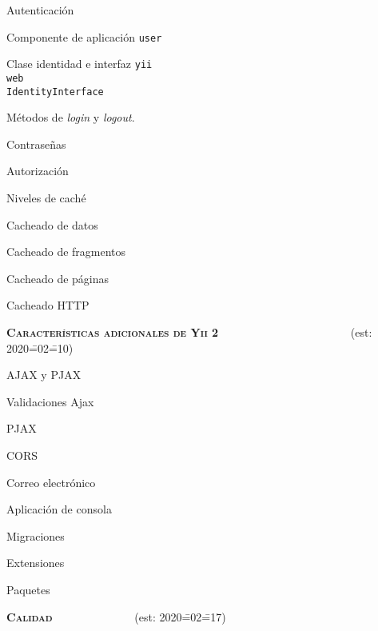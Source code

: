 \begin{longenum}
\begin{longenum}
        \item Autenticación
        \begin{longenum}
            \item Componente de aplicación \texttt{user}
            \item Clase identidad e interfaz \texttt{yii\\web\\IdentityInterface}
            \item Métodos de \textit{login} y \textit{logout}.
        \end{longenum}
        \item Contraseñas
        \item Autorización
        \item Niveles de caché
        \begin{longenum}
            \item Cacheado de datos
            \item Cacheado de fragmentos
            \item Cacheado de páginas
            \item Cacheado HTTP
        \end{longenum}
    \end{longenum}
    \item \textbf{\textsc{Características adicionales de Yii 2}} \ \ \ \ \ \ \ \ \ \ \ \ \ \ \ \ \ \ \ \ \ \ \ (est: 2020\==02\==10)
    \begin{longenum}
        \item AJAX y PJAX
        \begin{longenum}
            \item Validaciones Ajax
            \item PJAX \opcional\
            \item CORS \opcional\
        \end{longenum}
        \item Correo electrónico
        \item Aplicación de consola
        \item Migraciones
        \item Extensiones
        \item Paquetes
    \end{longenum}
    \item \textbf{\textsc{Calidad}} \ \ \ \ \ \ \ \ \ \ \ \ \ \ (est: 2020\==02\==17)

\end{longenum}
